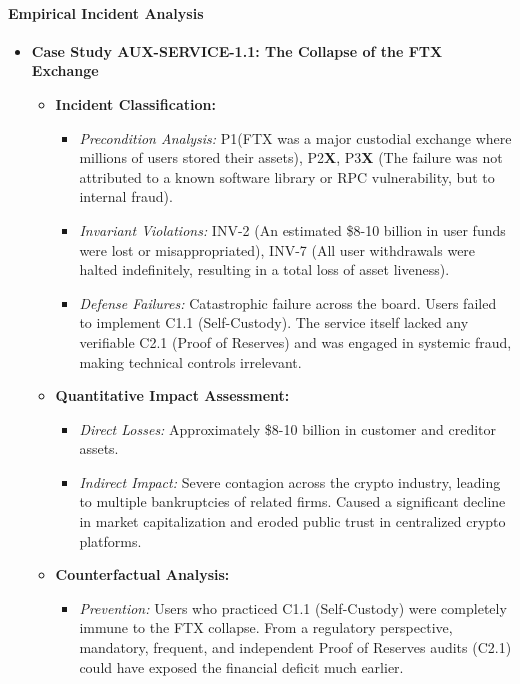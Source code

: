 \paragraph{Empirical Incident Analysis}
\begin{itemize}
    \item \textbf{Case Study AUX-SERVICE-1.1: The Collapse of the FTX Exchange}
        \begin{itemize}
            \item \textbf{Incident Classification:}
                \begin{itemize}
                    \item \textit{Precondition Analysis:} P1\checkmark (FTX was a major custodial exchange where millions of users stored their assets), P2\textbf{X}, P3\textbf{X} (The failure was not attributed to a known software library or RPC vulnerability, but to internal fraud).
                    \item \textit{Invariant Violations:} INV-2 (An estimated \$8-10 billion in user funds were lost or misappropriated), INV-7 (All user withdrawals were halted indefinitely, resulting in a total loss of asset liveness).
                    \item \textit{Defense Failures:} Catastrophic failure across the board. Users failed to implement C1.1 (Self-Custody). The service itself lacked any verifiable C2.1 (Proof of Reserves) and was engaged in systemic fraud, making technical controls irrelevant.
                \end{itemize}
            \item \textbf{Quantitative Impact Assessment:}
                \begin{itemize}
                    \item \textit{Direct Losses:} Approximately \$8-10 billion in customer and creditor assets.
                    \item \textit{Indirect Impact:} Severe contagion across the crypto industry, leading to multiple bankruptcies of related firms. Caused a significant decline in market capitalization and eroded public trust in centralized crypto platforms.
                \end{itemize}
            \item \textbf{Counterfactual Analysis:}
                \begin{itemize}
                    \item \textit{Prevention:} Users who practiced C1.1 (Self-Custody) were completely immune to the FTX collapse. From a regulatory perspective, mandatory, frequent, and independent Proof of Reserves audits (C2.1) could have exposed the financial deficit much earlier.
                \end{itemize}
        \end{itemize}
\end{itemize}

